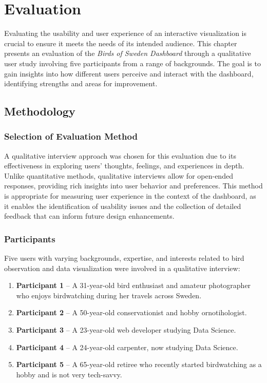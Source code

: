 \chapter{Evaluation}

Evaluating the usability and user experience of an interactive visualization is crucial to ensure it meets the needs of its intended audience. This chapter presents an evaluation of the \textit{Birds of Sweden Dashboard} through a qualitative user study involving five participants from a range of backgrounds. The goal is to gain insights into how different users perceive and interact with the dashboard, identifying strengths and areas for improvement.

\section{Methodology}

\subsection{Selection of Evaluation Method}

A qualitative interview approach was chosen for this evaluation due to its effectiveness in exploring users' thoughts, feelings, and experiences in depth. Unlike quantitative methods, qualitative interviews allow for open-ended responses, providing rich insights into user behavior and preferences. This method is appropriate for measuring user experience in the context of the dashboard, as it enables the identification of usability issues and the collection of detailed feedback that can inform future design enhancements.

\subsection{Participants}

Five users with varying backgrounds, expertise, and interests related to bird observation and data visualization were involved in a qualitative interview:

\begin{enumerate} 
    \item \textbf{Participant 1} -- A 31-year-old bird enthusiast and amateur photographer who enjoys birdwatching during her travels across Sweden.
    \item \textbf{Participant 2} -- A 50-year-old conservationist and hobby ornotihologist.
    \item \textbf{Participant 3} -- A 23-year-old web developer studying Data Science.
    \item \textbf{Participant 4} -- A 24-year-old carpenter, now studying Data Science.
    \item \textbf{Participant 5} -- A 65-year-old retiree who recently started birdwatching as a hobby and is not very tech-savvy.
\end{enumerate}

